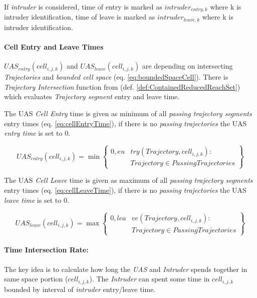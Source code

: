 \begin{note}
    If \emph{intruder} is considered, time of entry is marked as $intruder_{entry,k}$ where k is intruder identification, time of leave is marked as $intruder_{leave,k}$ where k is intruder identification. 
\end{note}

\paragraph{Cell Entry and Leave Times} $UAS_{entry}(cell_{i,j,k})$ and $UAS_{leave}(cell_{i,j,k})$ are depending on intersecting  \emph{Trajectories} and \emph{bounded cell space} (eq. \ref{eq:boundedSpaceCell}). There is \emph{Trajectory Intersection} function from (def. \ref{def:ContainedReducedReachSet}) which evaluates \emph{Trajectory segment} entry and leave time. 

The UAS \emph{Cell Entry} time is given as minimum of all \emph{passing trajectory segments} entry times (eq. \ref{eq:cellEntryTime}), if there is no \emph{passing trajectories} the UAS \emph{entry time} is set to 0.

\begin{equation}\label{eq:cellEntryTime}
    UAS_{entry}(cell_{i,j,k}) =  \min 
    \left\{\begin{aligned}
    0,en&try(Trajectory,cell_{i,j,k}):\\ &Trajectory\in Passing Trajectories
    \end{aligned}\right\}
\end{equation}

The UAS \emph{Cell Leave} time is given as maximum of all \emph{passing trajectory segments} entry times (eq. \ref{eq:cellLeaveTime}), if there is no \emph{passing trajectories} the UAS \emph{leave time} is set to 0.

\begin{equation}\label{eq:cellLeaveTime}
    UAS_{leave}(cell_{i,j,k}) =  \max 
    \left\{\begin{aligned}
    0,lea&ve(Trajectory,cell_{i,j,k}):\\ &Trajectory\in Passing Trajectories
    \end{aligned}\right\}
\end{equation}

\paragraph{Time Intersection Rate:} The key idea is to calculate how long the \emph{UAS} and \emph{Intruder} spends together in same space portion ($cell_{i,j,k}$). 
The \emph{Intruder} can spent some time in $cell_{i,j,k}$ bounded by interval of \emph{intruder} entry/leave time. 

